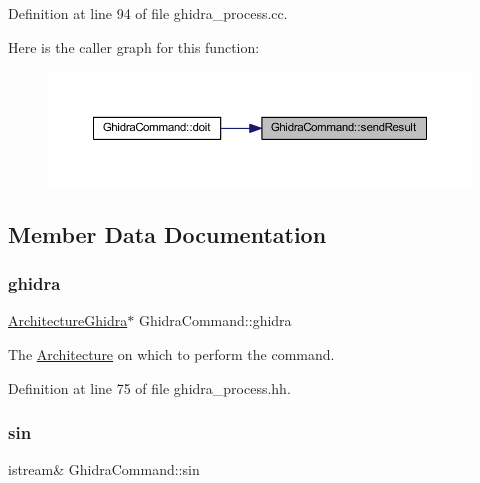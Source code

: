 Definition at line 94 of file ghidra\+\_\+process.\+cc.

Here is the caller graph for this function\+:
\nopagebreak
\begin{figure}[H]
\begin{center}
\leavevmode
\includegraphics[width=350pt]{class_ghidra_command_a964ade9b1f768c55434d412834ba2eca_icgraph}
\end{center}
\end{figure}


\subsection{Member Data Documentation}
\mbox{\label{class_ghidra_command_ad5647427395bb496d4647f79f04a05aa}} 
\subsubsection{\texorpdfstring{ghidra}{ghidra}}
{\footnotesize\ttfamily \mbox{\hyperlink{class_architecture_ghidra}{Architecture\+Ghidra}}$\ast$ Ghidra\+Command\+::ghidra\hspace{0.3cm}{\ttfamily [protected]}}



The \mbox{\hyperlink{class_architecture}{Architecture}} on which to perform the command. 



Definition at line 75 of file ghidra\+\_\+process.\+hh.

\mbox{\label{class_ghidra_command_af8206fa1ff96a669871717739f25a337}} 
\subsubsection{\texorpdfstring{sin}{sin}}
{\footnotesize\ttfamily istream\& Ghidra\+Command\+::sin\hspace{0.3cm}{\ttfamily [protected]}}



